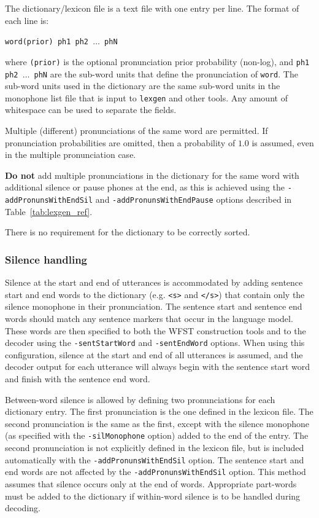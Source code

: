 \documentclass[a4paper,12pt]{report}
\begin{document}
The dictionary/lexicon file is a text file with one entry per line. The format of each line is:

\vspace{5mm}
{\tt word(prior) ph1 ph2 $\dots$ phN}
\vspace{5mm}

where {\tt(prior)} is the optional pronunciation prior probability (non-log), and {\tt ph1 ph2 $\dots$ phN} are the sub-word units that define the pronunciation of {\tt word}. The sub-word units used in the dictionary are the same sub-word units in the monophone list file that is input to {\tt lexgen} and other tools. Any amount of whitespace can be used to separate the fields.

Multiple (different) pronunciations of the same word are permitted. If pronunciation probabilities are omitted, then a probability of $1.0$ is assumed, even in the multiple pronunciation case.

{\bf Do not} add multiple pronunciations in the dictionary for the same word with additional silence or pause phones at the end, as this is achieved using the {\tt -addPronunsWithEndSil} and {\tt -addPronunsWithEndPause} options described in Table~\ref{tab:lexgen_ref}.

There is no requirement for the dictionary to be correctly sorted.


\subsubsection{Silence handling}

Silence at the start and end of utterances is accommodated by adding sentence start and end words to the dictionary (e.g. {\tt <s>} and {\tt </s>}) that contain only the silence monophone in their pronunciation. The sentence start and sentence end words should match any sentence markers that occur in the language model. These words are then specified to both the WFST construction tools and to the decoder using the {\tt -sentStartWord} and {\tt -sentEndWord} options. When using this configuration, silence at the start and end of all utterances is assumed, and the decoder output for each utterance will always begin with the sentence start word and finish with the sentence end word.

Between-word silence is allowed by defining two pronunciations for each dictionary entry. The first pronunciation is the one defined in the lexicon file. The second pronunciation is the same as the first, except with the silence monophone (as specified with the {\tt -silMonophone} option) added to the end of the entry. The second pronunciation is not explicitly defined in the lexicon file, but is included automatically with the {\tt -addPronunsWithEndSil} option. The sentence start and end words are not affected by the {\tt -addPronunsWithEndSil} option. This method assumes that silence occurs only at the end of words. Appropriate part-words must be added to the dictionary if within-word silence is to be handled during decoding.
\end{document}
